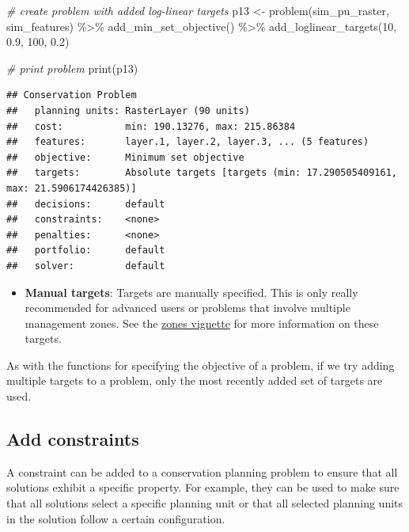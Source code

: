 \documentclass[
  12pt,
]{book}
\newenvironment{Shaded}{\begin{snugshade}}{\end{snugshade}}
\newcommand{\CommentTok}[1]{\textcolor[rgb]{0.56,0.35,0.01}{\textit{#1}}}
\newcommand{\DecValTok}[1]{\textcolor[rgb]{0.00,0.00,0.81}{#1}}
\newcommand{\FloatTok}[1]{\textcolor[rgb]{0.00,0.00,0.81}{#1}}
\newcommand{\FunctionTok}[1]{\textcolor[rgb]{0.00,0.00,0.00}{#1}}
\newcommand{\NormalTok}[1]{#1}
\newcommand{\OtherTok}[1]{\textcolor[rgb]{0.56,0.35,0.01}{#1}}
\newcommand{\SpecialCharTok}[1]{\textcolor[rgb]{0.00,0.00,0.00}{#1}}
\providecommand{\tightlist}{%
  \setlength{\itemsep}{0pt}\setlength{\parskip}{0pt}}
\begin{document}
\begin{Shaded}
\begin{Highlighting}[]
\CommentTok{\# create problem with added log{-}linear targets}
\NormalTok{p13 }\OtherTok{\textless{}{-}} \FunctionTok{problem}\NormalTok{(sim\_pu\_raster, sim\_features) }\SpecialCharTok{\%\textgreater{}\%}
  \FunctionTok{add\_min\_set\_objective}\NormalTok{() }\SpecialCharTok{\%\textgreater{}\%}
  \FunctionTok{add\_loglinear\_targets}\NormalTok{(}\DecValTok{10}\NormalTok{, }\FloatTok{0.9}\NormalTok{, }\DecValTok{100}\NormalTok{, }\FloatTok{0.2}\NormalTok{)}

\CommentTok{\# print problem}
\FunctionTok{print}\NormalTok{(p13)}
\end{Highlighting}
\end{Shaded}

\begin{verbatim}
## Conservation Problem
##   planning units: RasterLayer (90 units)
##   cost:           min: 190.13276, max: 215.86384
##   features:       layer.1, layer.2, layer.3, ... (5 features)
##   objective:      Minimum set objective 
##   targets:        Absolute targets [targets (min: 17.290505409161, max: 21.5906174426385)]
##   decisions:      default
##   constraints:    <none>
##   penalties:      <none>
##   portfolio:      default
##   solver:         default
\end{verbatim}

\begin{itemize}
\tightlist
\item
  \textbf{Manual targets}: Targets are manually specified. This is only really recommended for advanced users or problems that involve multiple management zones. See the \href{zones.html}{zones vignette} for more information on these targets.
\end{itemize}

As with the functions for specifying the objective of a problem, if we try adding multiple targets to a problem, only the most recently added set of targets are used.

\hypertarget{add-constraints}{%
\subsection{Add constraints}\label{add-constraints}}

A constraint can be added to a conservation planning problem to ensure that all solutions exhibit a specific property. For example, they can be used to make sure that all solutions select a specific planning unit or that all selected planning units in the solution follow a certain configuration.
\end{document}
